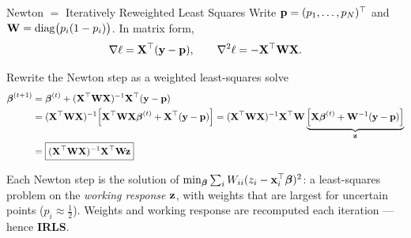 \documentclass[11pt,aspectratio=169]{beamer}
\begin{document}
\begin{frame}{Newton $=$ Iteratively Reweighted Least Squares}\small
Write $\mathbf{p}=(p_1,\dots,p_N)^{\top}$ and $\mathbf{W}=\operatorname{diag}\bigl(p_i(1-p_i)\bigr)$. In matrix form,
\[
\nabla\ell=\mathbf{X}^{\top}(\mathbf{y}-\mathbf{p}),\qquad \nabla^2\ell=-\mathbf{X}^{\top}\mathbf{W}\mathbf{X} .
\]
\begin{derivation}{Rewrite the Newton step as a weighted least-squares solve}
\begin{align*}
\boldsymbol{\beta}^{(t+1)}&=\boldsymbol{\beta}^{(t)}+(\mathbf{X}^{\top}\mathbf{W}\mathbf{X})^{-1}\mathbf{X}^{\top}(\mathbf{y}-\mathbf{p})\\
&=(\mathbf{X}^{\top}\mathbf{W}\mathbf{X})^{-1}\Bigl[\mathbf{X}^{\top}\mathbf{W}\mathbf{X}\boldsymbol{\beta}^{(t)}+\mathbf{X}^{\top}(\mathbf{y}-\mathbf{p})\Bigr]
=(\mathbf{X}^{\top}\mathbf{W}\mathbf{X})^{-1}\mathbf{X}^{\top}\mathbf{W}\underbrace{\Bigl[\mathbf{X}\boldsymbol{\beta}^{(t)}+\mathbf{W}^{-1}(\mathbf{y}-\mathbf{p})\Bigr]}_{\mathbf{z}}\\
&=\boxed{(\mathbf{X}^{\top}\mathbf{W}\mathbf{X})^{-1}\mathbf{X}^{\top}\mathbf{W}\mathbf{z}}
\end{align*}
\end{derivation}
Each Newton step is the solution of $\min_{\boldsymbol{\beta}}\sum_iW_{ii}(z_i-\mathbf{x}_i^{\top}\boldsymbol{\beta})^2$: a least-squares problem on the
\emph{working response} $\mathbf{z}$, with weights that are largest for uncertain points ($p_i\approx\tfrac12$).
Weights and working response are recomputed each iteration --- hence \textbf{IRLS}.
\end{frame}
\end{document}
